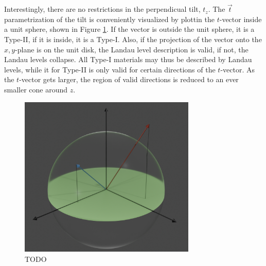 

Interestingly, there are no restrictions in the perpendicual tilt, \( t_z \).
The \( \vec{t} \) parametrization of the tilt is conveniently visualized by plottin the \( t \)-vector inside a unit sphere, shown in Figure \ref{fig:tiltSphere}.
If the vector is outside the unit sphere, it is a Type-II, if it is inside, it is a Type-I.
Also, if the projection of the vector onto the \(x,y\)-plane is on the unit disk, the Landau level description is valid, if not, the Landau levels collapse.
All Type-I materials may thus be described by Landau levels, while it for Type-II is only valid for certain directions of the \(t\)-vector.
As the \(t\)-vector gets larger, the region of valid directions is reduced to an ever smaller cone around \(z\).
\begin{figure}[ht]
  \centering
  \includegraphics[width=0.75\textwidth]{figures/tiltSpherewBackground.png}
  \caption{\label{fig:tiltSphere} TODO}
\end{figure}

